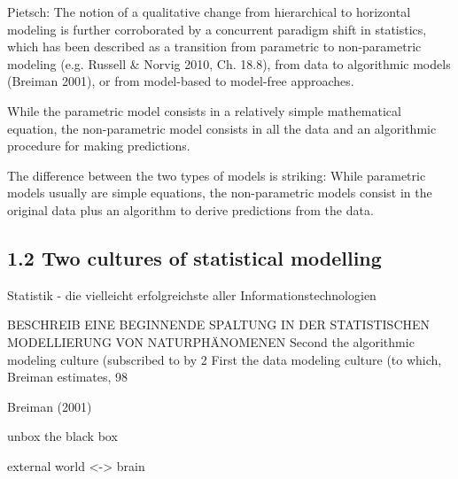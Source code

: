 \documentclass[authoryear,review,3p]{elsarticle}
\begin{document}
Pietsch:
The notion of a qualitative change from hierarchical to horizontal modeling is further corroborated by a concurrent paradigm shift in statistics, which has been described as a transition from parametric to non-parametric modeling (e.g. Russell & Norvig 2010, Ch. 18.8), from data to algorithmic models (Breiman 2001), or from model-based to model-free approaches. 

While the parametric model consists in a relatively simple mathematical equation, the non-parametric model consists in all the data and an algorithmic procedure for making predictions.

The difference between the two types of models is striking: While parametric models usually are simple equations, the non-parametric models consist in the original data plus an algorithm to derive predictions from the data.




\subsection*{1.2 Two cultures of statistical modelling}

Statistik - die vielleicht erfolgreichste aller Informationstechnologien




BESCHREIB EINE BEGINNENDE SPALTUNG IN DER STATISTISCHEN MODELLIERUNG VON NATURPHÄNOMENEN
Second the algorithmic modeling culture (subscribed to by 2%
First the data modeling culture (to which, Breiman estimates, 98%


Breiman (2001)


unbox the black box

external world <-> brain
\end{document}
